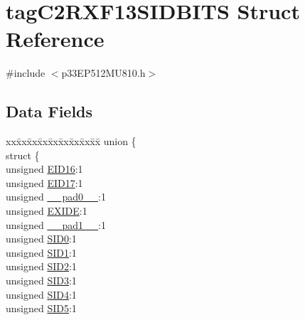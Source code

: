 \hypertarget{structtag_c2_r_x_f13_s_i_d_b_i_t_s}{}\section{tag\+C2\+R\+X\+F13\+S\+I\+D\+B\+I\+TS Struct Reference}
\label{structtag_c2_r_x_f13_s_i_d_b_i_t_s}


{\ttfamily \#include $<$p33\+E\+P512\+M\+U810.\+h$>$}

\subsection*{Data Fields}
\begin{DoxyCompactItemize}
\item 
\begin{tabbing}
xx\=xx\=xx\=xx\=xx\=xx\=xx\=xx\=xx\=\kill
union \{\\
\>struct \{\\
\>\>unsigned \hyperlink{structtag_c2_r_x_f13_s_i_d_b_i_t_s_a6dd5663b0c9838c56db040560ca0efa1}{EID16}:1\\
\>\>unsigned \hyperlink{structtag_c2_r_x_f13_s_i_d_b_i_t_s_aa648615464b0eb29967529333eee9fd9}{EID17}:1\\
\>\>unsigned \hyperlink{structtag_c2_r_x_f13_s_i_d_b_i_t_s_adf71f3d8410c1f1dbbc96680a92c49af}{\_\_pad0\_\_}:1\\
\>\>unsigned \hyperlink{structtag_c2_r_x_f13_s_i_d_b_i_t_s_a09ff1c1be3927220bd3dfbc10edfe243}{EXIDE}:1\\
\>\>unsigned \hyperlink{structtag_c2_r_x_f13_s_i_d_b_i_t_s_acaf2d0924a107ec6e8d2e31febaf66f9}{\_\_pad1\_\_}:1\\
\>\>unsigned \hyperlink{structtag_c2_r_x_f13_s_i_d_b_i_t_s_a1ca276ac15df60e1f7b9a6d0011ade93}{SID0}:1\\
\>\>unsigned \hyperlink{structtag_c2_r_x_f13_s_i_d_b_i_t_s_a3405d354f81391f879648f69f504dfc8}{SID1}:1\\
\>\>unsigned \hyperlink{structtag_c2_r_x_f13_s_i_d_b_i_t_s_ad744966dfc49307f731b7045b01b94e5}{SID2}:1\\
\>\>unsigned \hyperlink{structtag_c2_r_x_f13_s_i_d_b_i_t_s_a9345f3e64720be93e83d8dfc827f3f45}{SID3}:1\\
\>\>unsigned \hyperlink{structtag_c2_r_x_f13_s_i_d_b_i_t_s_aefb106fed4bb40e2c3c71ac612c554e3}{SID4}:1\\
\>\>unsigned \hyperlink{structtag_c2_r_x_f13_s_i_d_b_i_t_s_a0f221b3c9612231686bf87ccdcec8489}{SID5}:1\\

\end{tabbing}
\end{DoxyCompactItemize}
